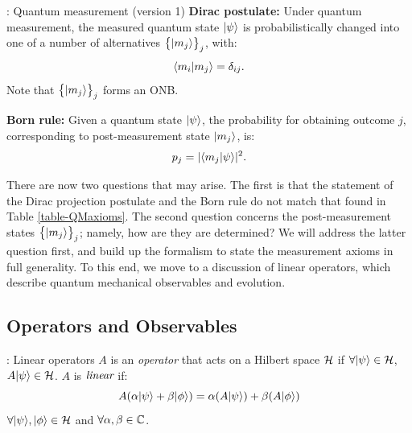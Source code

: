 \begin{axiombox}{: Quantum measurement (version 1)}\label{axiom-measurementver1}
    \textbf{Dirac postulate:} Under quantum measurement, the measured quantum state $\lvert \psi \rangle$ is probabilistically changed into one of a number of alternatives $\set{\lvert m_j \rangle}_j$, with:
    \begin{equation}
        \langle m_i \lvert m_j \rangle = \delta_{ij}.
    \end{equation}
    Note that $\set{\lvert m_j \rangle}_j$ forms an ONB.
    
    \textbf{Born rule:} Given a quantum state $\lvert \psi \rangle$, the probability for obtaining outcome $j$, corresponding to post-measurement state $\lvert m_j \rangle$, is:
    \begin{equation}
        p_j = \lvert \langle m_j \lvert \psi \rangle \rvert^2.
    \end{equation}
\end{axiombox}

There are now two questions that may arise. The first is that the statement of the Dirac projection postulate and the Born rule do not match that found in Table \ref{table-QMaxioms}. The second question concerns the post-measurement states $\set{\lvert m_j \rangle}_j$; namely, how are they are determined? We will address the latter question first, and build up the formalism to state the measurement axioms in full generality. To this end, we move to a discussion of linear operators, which describe quantum mechanical observables and evolution. 

\subsection{Operators and Observables}

\begin{defbox}{: Linear operators}\label{def-linops}
    $A$ is an \emph{operator} that acts on a Hilbert space $\mathcal{H}$ if $\forall \lvert \psi \rangle \in \mathcal{H}$, $A\lvert \psi \rangle \in \mathcal{H}$. $A$ is $\emph{linear}$ if:
    \begin{equation}
        A(\alpha\ket{\psi} + \beta\ket{\phi}) = \alpha(A\ket{\psi}) + \beta(A\ket{\phi})
    \end{equation}
    $\forall \ket{\psi}, \ket{\phi} \in \H$ and $\forall \alpha, \beta \in \mathbb{C}$.
\end{defbox}

